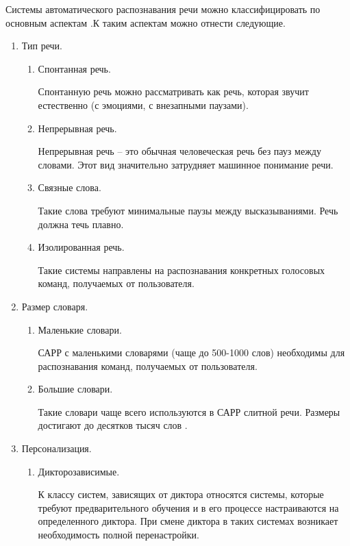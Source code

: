 Системы автоматического распознавания речи можно классифицировать по основным аспектам \cite{classif}.К таким аспектам можно отнести следующие. 
\begin{enumerate}
	\item Тип речи.
	\begin{enumerate}
		\item Спонтанная речь.
		
		Спонтанную речь можно рассматривать как речь, которая звучит естественно (с эмоциями, с внезапными паузами).
		
		\item Непрерывная речь. 
		
		Непрерывная речь -- это обычная человеческая речь без пауз между словами. Этот вид значительно затрудняет машинное понимание речи.
		
		\item Связные слова.
		
		Такие слова требуют минимальные паузы между высказываниями. Речь должна течь плавно.
		
		\item Изолированная речь.
		
		Такие системы направлены на распознавания конкретных голосовых команд, получаемых от пользователя.
		
	\end{enumerate}
	
	\item Размер словаря.
	\begin{enumerate}
		\item Маленькие словари.
		
		САРР с маленькими словарями (чаще до 500-1000 слов) необходимы для распознавания команд, получаемых от пользователя.
		
		\item Большие словари.
		
		Такие словари чаще всего используются в САРР слитной речи. Размеры достигают до десятков тысяч слов \cite{babin}.
	\end{enumerate}
	
	\item Персонализация.
	\begin{enumerate}
		\item Дикторозависимые.
		
		К классу систем, зависящих от диктора относятся системы, которые требуют предварительного обучения и в его процессе настраиваются на определенного диктора. При смене диктора в таких системах возникает необходимость полной перенастройки. 
		

\end{enumerate}
\end{enumerate}
